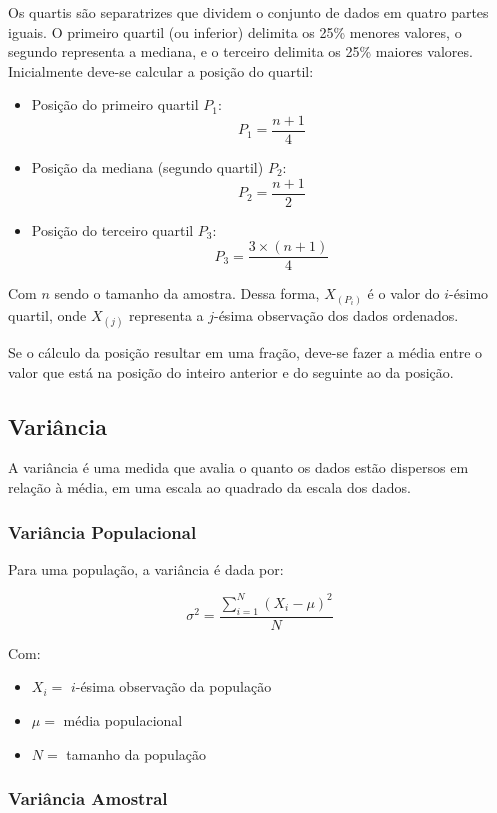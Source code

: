 \documentclass[
]{estat/estat}
\begin{document}
Os quartis são separatrizes que dividem o conjunto de dados em quatro
partes iguais. O primeiro quartil (ou inferior) delimita os 25\% menores
valores, o segundo representa a mediana, e o terceiro delimita os 25\%
maiores valores. Inicialmente deve-se calcular a posição do quartil:

\begin{itemize}
\item
  Posição do primeiro quartil \(P_1\): \[P_1=\frac{n+1}{4}\]
\item
  Posição da mediana (segundo quartil) \(P_2\): \[P_2 = \frac{n+1}{2}\]
\item
  Posição do terceiro quartil \(P_3\): \[P_3=\frac{3 \times (n+1)}{4}\]
\end{itemize}

Com \(n\) sendo o tamanho da amostra. Dessa forma,
\(X_{\left( P_i \right)}\) é o valor do \(i\)-ésimo quartil, onde
\(X_{\left( j \right)}\) representa a \(j\)-ésima observação dos dados
ordenados.

Se o cálculo da posição resultar em uma fração, deve-se fazer a média
entre o valor que está na posição do inteiro anterior e do seguinte ao
da posição.

\subsection{Variância}\label{variuxe2ncia}

A variância é uma medida que avalia o quanto os dados estão dispersos em
relação à média, em uma escala ao quadrado da escala dos dados.

\subsubsection{Variância Populacional}\label{variuxe2ncia-populacional}

Para uma população, a variância é dada por:

\[\sigma^2=\frac{\sum\limits_{i=1}^{N}\left(X_i - \mu\right)^2}{N}\]

Com:

\begin{itemize}
\item
  \(X_i =\) \(i\)-ésima observação da população
\item
  \(\mu =\) média populacional
\item
  \(N =\) tamanho da população
\end{itemize}

\subsubsection{Variância Amostral}\label{variuxe2ncia-amostral}
\end{document}
